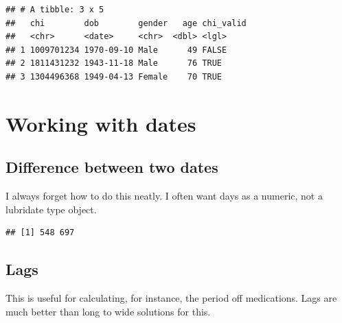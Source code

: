 \documentclass[]{book}
\newenvironment{Shaded}{\begin{snugshade}}{\end{snugshade}}
\newcommand{\KeywordTok}[1]{\textcolor[rgb]{0.13,0.29,0.53}{\textbf{#1}}}
\newcommand{\NormalTok}[1]{#1}
\newcommand{\OperatorTok}[1]{\textcolor[rgb]{0.81,0.36,0.00}{\textbf{#1}}}
\newcommand{\StringTok}[1]{\textcolor[rgb]{0.31,0.60,0.02}{#1}}
\begin{document}
\begin{verbatim}
## # A tibble: 3 x 5
##   chi        dob        gender   age chi_valid
##   <chr>      <date>     <chr>  <dbl> <lgl>    
## 1 1009701234 1970-09-10 Male      49 FALSE    
## 2 1811431232 1943-11-18 Male      76 TRUE     
## 3 1304496368 1949-04-13 Female    70 TRUE
\end{verbatim}

\hypertarget{working-with-dates}{%
\section{Working with dates}\label{working-with-dates}}

\hypertarget{difference-between-two-dates}{%
\subsection{Difference between two dates}\label{difference-between-two-dates}}

I always forget how to do this neatly.
I often want days as a numeric, not a lubridate type object.

\begin{Shaded}
\end{Shaded}

\begin{verbatim}
## [1] 548 697
\end{verbatim}

\hypertarget{lags}{%
\subsection{Lags}\label{lags}}

This is useful for calculating, for instance, the period off medications. Lags are much better than long to wide solutions for this.
\end{document}
